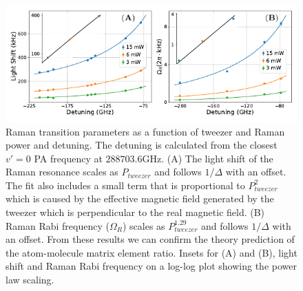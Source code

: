 \documentclass[aps,prl,twocolumn,superscriptaddress]{revtex4-1}
\begin{document}
\begin{figure}
  \includegraphics[width=\textwidth]{fig4.pdf}
  \caption{Raman transition parameters as a function of tweezer and Raman power and detuning.
    The detuning is calculated from the closest $v'=0$ PA frequency at $288703.6\mathrm{GHz}$.
    (A) The light shift of the Raman resonance scales as $P_{tweezer}$
    and follows $1/\Delta$ with an offset.
    The fit also includes a small term that is proportional to $P_{tweezer}^2$
    which is caused by the effective magnetic field generated by the tweezer which is
    perpendicular to the real magnetic field.
    (B) Raman Rabi frequency ($\Omega_R$) scales as $P_{tweezer}^{1.29}$
    and follows $1/\Delta$ with an offset.
    From these results we can confirm the theory prediction of
    the atom-molecule matrix element ratio.
    Insets for (A) and (B), light shift and Raman Rabi frequency on a log-log plot
    showing the power law scaling.
    \label{f-det}}
\end{figure}
\end{document}

